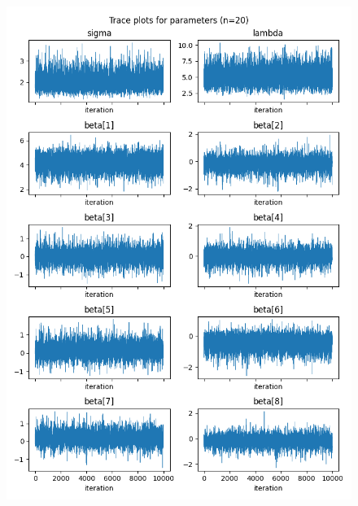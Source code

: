 \documentclass[a4paper, 10pt]{article}
\begin{document}
\begin{figure}[htb]
    \begin{center}
        \includegraphics[height=.4\textheight]{../outputs/artificial_scenarios_n=20/scenario_3/traceplots.png}

\end{center}
\end{figure}
\end{document}
